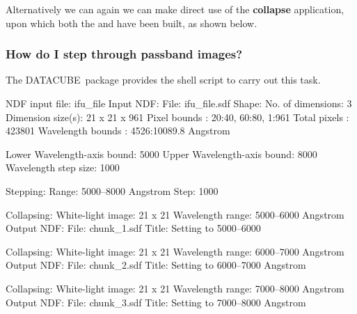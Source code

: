 \documentclass[twoside,11pt]{starlink}
\providecommand{\DATACUBE}{{\footnotesize DATACUBE}\normalsize}
\begin{document}
Alternatively we can again we can make direct use of the \textbf{collapse}
application, upon which both the 
and  have been built, as shown
below.

\begin{small}
\begin{terminalv}
\end{terminalv}
\end{small}

\subsubsection{How do I step through passband images?}


The \DATACUBE\ package provides the 
shell script to carry out this task.

\begin{small}
\begin{terminalv}
NDF input file: ifu_file
     Input NDF:
       File: ifu_file.sdf
     Shape:
       No. of dimensions: 3
       Dimension size(s): 21 x 21 x 961
       Pixel bounds     : 20:40, 60:80, 1:961
       Total pixels     : 423801
       Wavelength bounds : 4526:10089.8 Angstrom

Lower Wavelength-axis bound: 5000
Upper Wavelength-axis bound: 8000
Wavelength step size: 1000

    Stepping:
       Range: 5000--8000 Angstrom
       Step: 1000

     Collapsing:
       White-light image: 21 x 21
       Wavelength range: 5000--6000 Angstrom
     Output NDF:
       File: chunk_1.sdf
       Title: Setting to 5000--6000

     Collapsing:
       White-light image: 21 x 21
       Wavelength range: 6000--7000 Angstrom
     Output NDF:
       File: chunk_2.sdf
       Title: Setting to 6000--7000 Angstrom

     Collapsing:
       White-light image: 21 x 21
       Wavelength range: 7000--8000 Angstrom
     Output NDF:
       File: chunk_3.sdf
       Title: Setting to 7000--8000 Angstrom
%
\end{terminalv}
\end{small}
\end{document}
